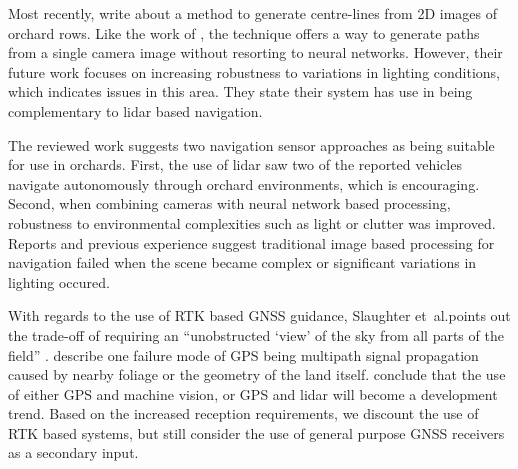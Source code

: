 \documentclass[preprint,authoryear,12pt]{elsarticle}
\begin{document}
        Most recently, \cite{Sharifi2015} write about a method to generate centre-lines from 2D images of orchard rows.
        Like the work of \cite{He2011}, the technique offers a way to generate paths from a single camera image without resorting to neural networks.
        However, their future work focuses on increasing robustness to variations in lighting conditions, which indicates issues in this area.
        They state their system has use in being complementary to lidar based navigation.

        The reviewed work suggests two navigation sensor approaches as being suitable for use in orchards.
        First, the use of lidar saw two of the reported vehicles navigate autonomously through orchard environments, which is encouraging.
        Second, when combining cameras with neural network based processing, robustness to environmental complexities such as light or clutter was improved.
        Reports and previous experience suggest traditional image based processing for navigation failed when the scene became complex or significant variations in lighting occured.


        With regards to the use of RTK based GNSS guidance, Slaughter et~al.\@ points out the trade-off of requiring an ``unobstructed `view' of the sky from all parts of the field'' \citep{Slaughter2008}.
        \cite{Durrant-Whyte2005} describe one failure mode of GPS being multipath signal propagation caused by nearby foliage or the geometry of the land itself.
        \cite{Li2009} conclude that the use of either GPS and machine vision, or GPS and lidar will become a development trend.
        Based on the increased reception requirements, we discount the use of RTK based systems, but still consider the use of general purpose GNSS receivers as a secondary input.
\end{document}

